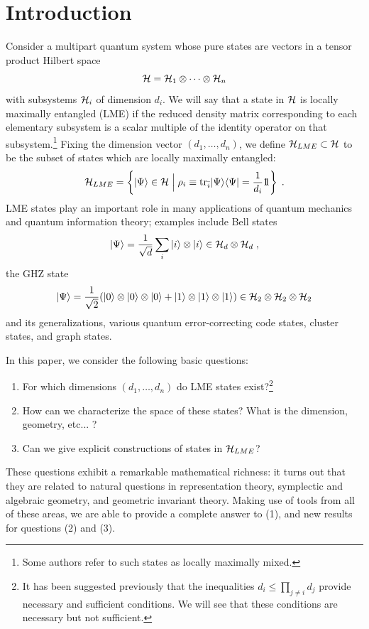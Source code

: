 \documentclass[12pt]{article}
\theoremstyle{definition}
\newcommand{\be}{\begin{equation}}
\newcommand{\ee}{\end{equation}}
\def\identity{{\rlap{1} \hskip 1.6pt \hbox{1}}}
\newcommand{\tr}{{\rm tr}}
\begin{document}
\section{Introduction}

Consider a multipart quantum system whose pure states are vectors in a tensor product Hilbert space
\[
{\cal H} = {\cal H}_{1} \otimes \cdots \otimes {\cal H}_{n} 
\]
with subsystems ${\cal H}_i$ of dimension $d_i$. We will say that a state in ${\cal H}$ is locally maximally entangled (LME) if the reduced density matrix corresponding to each elementary subsystem is a scalar multiple of the identity operator on that subsystem.\footnote{Some authors refer to such states as locally maximally mixed.}
Fixing the dimension vector $(d_1,\dots,d_n)$, we define ${\cal H}_{LME} \subset {\cal H}$ to be the subset of states which are locally maximally entangled:
\be
{\cal H}_{LME} = \left\{|\Psi \rangle \in {\cal H} \; \Big| \; \rho_i \equiv \tr_{\bar{i}}|\Psi \rangle \langle \Psi | = \frac{1}{d_i} \identity \right\}\; .
\ee
LME states play an important role in many applications of quantum mechanics and quantum information theory; examples include Bell states
\be
\label{Bell}
|\Psi \rangle = \frac{1}{\sqrt{d}} \sum_{i} |i \rangle \otimes |i \rangle \in {\cal H}_d \otimes {\cal H}_d \; ,
\ee
the GHZ state
\be
\label{GHZ}
|\Psi \rangle = \frac{1}{\sqrt{2}} (|0 \rangle \otimes |0 \rangle \otimes |0 \rangle  + |1 \rangle \otimes |1 \rangle \otimes |1 \rangle) \in {\cal H}_2 \otimes {\cal H}_2 \otimes {\cal H}_2
\ee
and its generalizations, various quantum error-correcting code states, cluster states, and graph states.

In this paper, we consider the following basic questions:
\begin{enumerate}
\item
For which dimensions $(d_1,\dots,d_n)$ do LME states exist?\footnote{It has been suggested previously that the inequalities $d_i \le \prod_{j \ne i} d_j$ provide necessary and sufficient conditions. We will see that these conditions are necessary but not sufficient.}
\item
How can we characterize the space of these states? What is the dimension, geometry, etc... ?
\item
Can we give explicit constructions of states in ${\cal H}_{LME}$?
\end{enumerate}
These questions exhibit a remarkable mathematical richness: it turns out that they are related to natural questions in representation theory, symplectic and algebraic geometry, and geometric invariant theory. Making use of tools from all of these areas, we are able to provide a complete answer to (1), and new results for questions (2) and (3).
\end{document}
